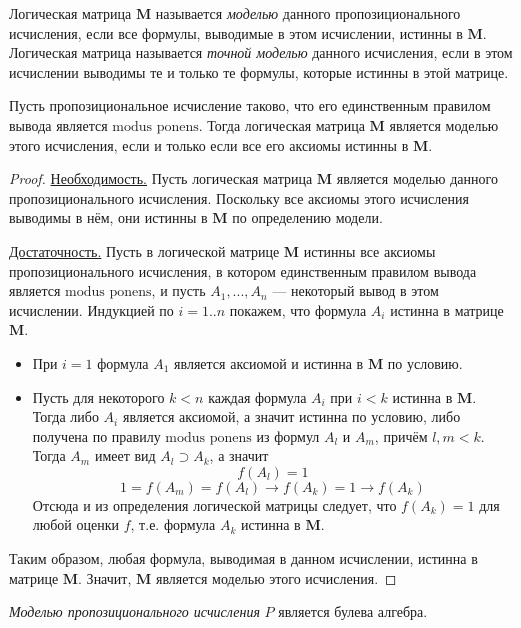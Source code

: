 \begin{definition}
    Логическая матрица $\mathbf{M}$ называется 
    \textit{моделью} данного пропозиционального исчисления, если все формулы, выводимые в этом исчислении, истинны в $\mathbf{M}$. Логическая матрица называется \textit{точной моделью} данного исчисления, если в этом исчислении выводимы те и только те формулы, которые истинны в этой матрице.
\end{definition}

\begin{theorem}
    Пусть пропозициональное исчисление таково, что его единственным правилом вывода является $\text{modus ponens}$. Тогда логическая матрица $\mathbf{M}$ является моделью этого исчисления, если и только если все его аксиомы истинны в $\mathbf{M}$.
\end{theorem}
\begin{proof}
    \underline{Необходимость.} Пусть логическая матрица $\mathbf{M}$ является моделью данного пропозиционального исчисления. Поскольку все аксиомы этого исчисления выводимы в нём, они истинны в $\mathbf{M}$ по определению модели.

    \underline{Достаточность.} Пусть в логической матрице $\mathbf{M}$ истинны все аксиомы пропозиционального исчисления, в котором единственным правилом вывода является $\text{modus ponens}$, и пусть $A_1,...,A_n$ --- некоторый вывод в этом исчислении. Индукцией по $i=1..n$ покажем, что формула $A_i$ истинна в матрице $\mathbf{M}$.
    \begin{itemize}
        \item При $i=1$ формула $A_1$ является аксиомой и истинна в $\mathbf{M}$ по условию.
        \item Пусть для некоторого $k<n$ каждая формула $A_i$ при $i<k$ истинна в $\mathbf{M}$. Тогда либо $A_i$ является аксиомой, а значит истинна по условию, либо получена по правилу $\text{modus ponens}$ из формул $A_l$ и $A_m$, причём $l,m<k$. Тогда $A_m$ имеет вид $A_l \supset A_k$, а значит
        \begin{equation*}
            f(A_l)=1
        \end{equation*}
        \begin{equation*}
            1=f(A_m)=f(A_l)\to f(A_k)=1 \to f(A_k)
        \end{equation*}
        Отсюда и из определения логической матрицы следует, что $f(A_k) = 1$ для любой оценки $f$, т.е. формула $A_k$ истинна в $\mathbf{M}$.
    \end{itemize}
    Таким образом, любая формула, выводимая в данном исчислении, истинна в матрице $\mathbf{M}$. Значит, $\mathbf{M}$ является моделью этого исчисления.
\end{proof}

\begin{definition}
    \textit{Моделью пропозиционального исчисления} $P$ является булева алгебра.
\end{definition}